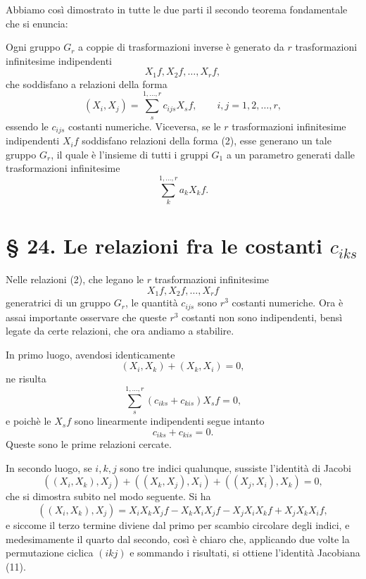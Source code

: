 \documentclass[11pt]{book}
\begin{document}
Abbiamo così dimostrato in tutte le due parti il secondo teorema fondamentale che si enuncia:

Ogni gruppo $G_r$ a coppie di trasformazioni inverse è generato da $r$ trasformazioni infinitesime indipendenti
\[
 X_1f,
 X_2f,
 \ldots,
 X_rf,
\]
che soddisfano a relazioni della forma
\begin{equation*}\tag{2}
 (X_i,X_j)=\sum\limits_s^{1,\ldots,r} c_{ijs}X_s f,
 \qquad i,j=1,2,\ldots,r,
\end{equation*}
essendo le $c_{ijs}$ costanti numeriche. Viceversa, se le $r$ trasformazioni infinitesime indipendenti $X_if$ soddisfano relazioni della forma (2), esse generano un tale gruppo $G_r$, il quale è l'insieme di tutti i gruppi $G_1$ a un parametro generati dalle trasformazioni infinitesime
\[
 \sum\limits_k^{1,\ldots,r} a_kX_kf.
\]

\section*{\S{} 24. Le relazioni fra le costanti $c_{iks}$}

Nelle relazioni (2), che legano le $r$ trasformazioni infinitesime
\[
 X_1f,
 X_2f,
 \ldots,
 X_rf
\]
generatrici di un gruppo $G_r$, le quantità $c_{ijs}$ sono $r^3$ costanti numeriche. Ora è assai importante osservare che queste $r^3$ costanti non sono indipendenti, bensì legate da certe relazioni, che ora andiamo a stabilire.

In primo luogo, avendosi identicamente
\[
 (X_i,X_k)+(X_k,X_i)=0,
\]
ne risulta
\[
 \sum\limits_s^{1,\ldots,r}(c_{iks}+c_{kis})X_s f=0,
\]
e poichè le $X_sf$ sono linearmente indipendenti segue intanto
\[
 c_{iks}+c_{kis}=0.
\]
Queste sono le prime relazioni cercate.

In secondo luogo, se $i,k,j$ sono tre indici qualunque, sussiste l'identità di Jacobi
\begin{equation*}\tag{11}
 ((X_i,X_k),X_j)+((X_k,X_j),X_i)+((X_j,X_i),X_k)=0,
\end{equation*}
che si dimostra subito nel modo seguente. Si ha
\[
 ((X_i,X_k),X_j)=X_iX_kX_jf-X_kX_iX_jf-X_jX_iX_kf+X_jX_kX_if,
\]
e siccome il terzo termine diviene dal primo per scambio circolare degli indici, e medesimamente il quarto dal secondo, così è chiaro che, applicando due volte la permutazione ciclica $(ikj)$ e sommando i risultati, si ottiene l'identità Jacobiana (11).
\end{document}
